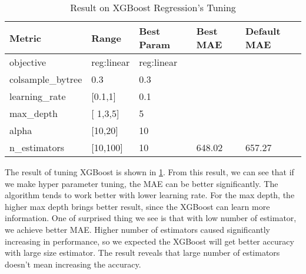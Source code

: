 \begin{table}[]
\small
\begin{tabular}{|l|l|l|l|l|}
\hline
{\color[HTML]{000000} \textbf{Metric}}   & {\color[HTML]{000000} \textbf{Range}} & {\color[HTML]{000000} \textbf{Best Param}} & {\color[HTML]{000000} \textbf{Best MAE}}        & {\color[HTML]{000000} \textbf{Default MAE}}     \\ \hline
{\color[HTML]{000000} objective}         & {\color[HTML]{000000} reg:linear}     & {\color[HTML]{000000} reg:linear}          & {\color[HTML]{000000} }                         & {\color[HTML]{000000} }                         \\ \cline{1-3}
{\color[HTML]{000000} colsample\_bytree} & {\color[HTML]{000000} 0.3}            & {\color[HTML]{000000} 0.3}                 & {\color[HTML]{000000} }                         & {\color[HTML]{000000} }                         \\ \cline{1-3}
{\color[HTML]{000000} learning\_rate}    & {\color[HTML]{000000} {[}0.1,1{]}}    & {\color[HTML]{000000} 0.1}                 & {\color[HTML]{000000} }                         & {\color[HTML]{000000} }                         \\ \cline{1-3}
{\color[HTML]{000000} max\_depth}        & {\color[HTML]{000000} {[} 1,3,5{]}}   & {\color[HTML]{000000} 5}                   & {\color[HTML]{000000} }                         & {\color[HTML]{000000} }                         \\ \cline{1-3}
{\color[HTML]{000000} alpha}             & {\color[HTML]{000000} {[}10,20{]}}    & {\color[HTML]{000000} 10}                  & {\color[HTML]{000000} }                         & {\color[HTML]{000000} }                         \\ \cline{1-3}
{\color[HTML]{000000} n\_estimators}     & {\color[HTML]{000000} {[}10,100{]}}   & {\color[HTML]{000000} 10}                  & \multirow{-6}{*}{{\color[HTML]{000000} 648.02}} & \multirow{-6}{*}{{\color[HTML]{000000} 657.27}} \\ \hline
\end{tabular}
\label{tblRQ32}
\caption{Result on XGBoost Regression's Tuning}
\end{table}

The result of tuning XGBoost is shown in \ref{tblRQ32}. From this result, we can see that if we make hyper parameter tuning, the MAE can be better significantly. The algorithm tends to work better with lower learning rate. For the max depth, the higher max depth brings better result, since the XGBoost can learn more information. One of surprised thing we see is that with low number of estimator, we achieve better MAE. Higher number of estimators caused significantly increasing in performance, so we expected the XGBoost will get better accuracy with large size estimator. The result reveals that large number of estimators doesn't mean increasing the accuracy.

